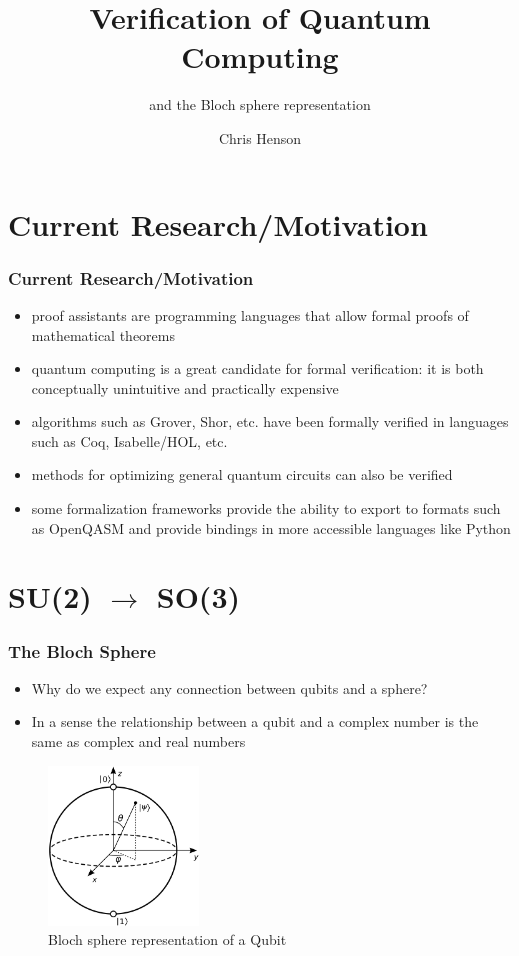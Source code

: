 \documentclass{beamer}
\title{Verification of Quantum Computing}
\subtitle{and the Bloch sphere representation}
\author{Chris Henson}
\institute{Drexel University}
\date{}
\begin{document}
\frame{\titlepage}

\section{Current Research/Motivation}
\begin{frame}
\frametitle{Current Research/Motivation}
\begin{itemize}
 \item proof assistants are programming languages that allow formal proofs of mathematical theorems
 \item quantum computing is a great candidate for formal verification: it is both conceptually unintuitive and practically expensive
 \item algorithms such as Grover, Shor, etc. have been formally verified in languages such as Coq, Isabelle/HOL, etc.
 \item methods for optimizing general quantum circuits can also be verified
 \item some formalization frameworks provide the ability to export to formats such as OpenQASM and provide bindings in more accessible languages like Python
\end{itemize}
\end{frame}

\section{SU(2) $\to$ SO(3)}

\begin{frame}
\frametitle{The Bloch Sphere}
\begin{itemize}
 \item Why do we expect any connection between qubits and a sphere?
 \item In a sense the relationship between a qubit and a complex number
	 		 is the same as complex and real numbers
\end{itemize}

\begin{figure}
		\includegraphics[width=4cm]{Bloch_sphere}
    \caption{Bloch sphere representation of a Qubit}
\end{figure}

\end{frame}
\end{document}
